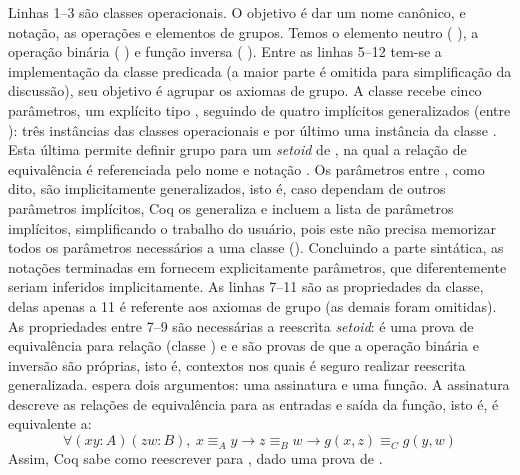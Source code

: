 Linhas 1--3 são classes operacionais. O objetivo é dar um nome canônico, e notação, as operações e elementos de grupos. Temos o elemento neutro (  ), a operação binária (  \coqinline{+}) e função inversa (  \coqinline{-}). Entre as linhas 5--12 tem-se a implementação da classe predicada  (a maior parte é omitida para simplificação da discussão), seu objetivo é agrupar os axiomas de grupo. A classe recebe cinco parâmetros, um explícito tipo , seguindo de quatro implícitos generalizados (entre ): três instâncias das classes operacionais e por último uma instância da classe . Esta última permite definir grupo para um \textit{setoid} de , na qual a relação de equivalência é referenciada pelo nome  e notação . Os parâmetros entre , como dito, são implicitamente generalizados, isto é, caso dependam de outros parâmetros implícitos, Coq os generaliza e incluem a lista de parâmetros implícitos, simplificando o trabalho do usuário, pois este não precisa memorizar todos os parâmetros necessários a uma classe (). Concluindo a parte sintática, as notações terminadas em  fornecem explicitamente parâmetros, que diferentemente seriam inferidos implicitamente. As linhas 7--11 são as propriedades da classe, delas apenas a 11 é referente aos axiomas de grupo (as demais foram omitidas). As propriedades entre 7--9 são necessárias a reescrita \textit{setoid}:  é uma prova de equivalência para relação  (classe ) e  e  são provas de que a operação binária e inversão são próprias, isto é, contextos nos quais é seguro realizar reescrita generalizada.  espera dois argumentos: uma assinatura e uma função. A assinatura descreve as relações de equivalência para as entradas e saída da função, isto é,  é equivalente a:
\begin{equation*}
	\forall (x y : A) (z w : B),~x \equiv_A y \rightarrow z \equiv_B w \rightarrow g(x,z) \equiv_C g(y,w)
\end{equation*}
Assim, Coq sabe como reescrever  para , dado uma prova de . 

